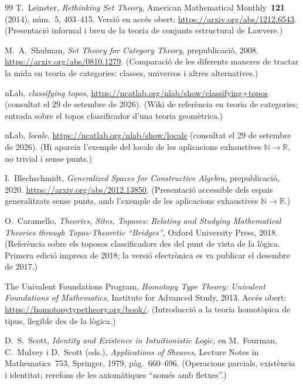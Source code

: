 \begin{thebibliography}{99}
T.~Leinster,
\emph{Rethinking Set Theory},
American Mathematical Monthly~\textbf{121} (2014), núm.~5, 403--415. Versió en accés obert: \url{https://arxiv.org/abs/1212.6543}.
\newblock (Presentació informal i breu de la teoria de conjunts estructural de Lawvere.)

M.~A.~Shulman,
\emph{Set Theory for Category Theory},
prepublicació, 2008. \url{https://arxiv.org/abs/0810.1279}.
\newblock (Comparació de les diferents maneres de tractar la mida en teoria de categories: classes, universos i altres alternatives.)

nLab,
\emph{classifying topos},
\url{https://ncatlab.org/nlab/show/classifying+topos} (consultat el 29 de setembre de 2026).
\newblock (Wiki de referència en teoria de categories; entrada sobre el topos classificador d'una teoria geomètrica.)

nLab,
\emph{locale},
\url{https://ncatlab.org/nlab/show/locale} (consultat el 29 de setembre de 2026).
\newblock (Hi apareix l'exemple del locale de les aplicacions exhaustives $\mathbb N\to\mathbb R$, no trivial i sense punts.)

I.~Blechschmidt,
\emph{Generalized Spaces for Constructive Algebra},
prepublicació, 2020. \url{https://arxiv.org/abs/2012.13850}.
\newblock (Presentació accessible dels espais generalitzats sense punts, amb l'exemple de les aplicacions exhaustives $\mathbb N\to\mathbb R$.)

O.~Caramello,
\emph{Theories, Sites, Toposes: Relating and Studying Mathematical Theories through Topos-Theoretic \enquote{Bridges}},
Oxford University Press, 2018.
\newblock (Referència sobre els toposos classificadors des del punt de vista de la lògica. Primera edició impresa de 2018; la versió electrònica es va publicar el desembre de 2017.)

The Univalent Foundations Program,
\emph{Homotopy Type Theory: Univalent Foundations of Mathematics},
Institute for Advanced Study, 2013. Accés obert: \url{https://homotopytypetheory.org/book/}.
\newblock (Introducció a la teoria homotòpica de tipus, llegible des de la lògica.)

D.~S.~Scott,
\emph{Identity and Existence in Intuitionistic Logic},
en M.~Fourman, C.~Mulvey i D.~Scott (eds.), \emph{Applications of Sheaves}, Lecture Notes in Mathematics~753, Springer, 1979, pàg.~660--696.
\newblock (Operacions parcials, existència i identitat; rerefons de les axiomàtiques \enquote{només amb fletxes}.)


\end{thebibliography}
